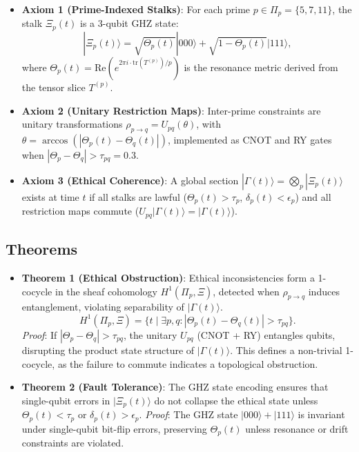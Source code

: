\documentclass{article}
\begin{document}
\begin{itemize}
    \item \textbf{Axiom 1 (Prime-Indexed Stalks)}: For each prime $p \in \Pi_p = \{5, 7, 11\}$, the stalk $\Xi_p(t)$ is a 3-qubit GHZ state:
    \[
    |\Xi_p(t)\rangle = \sqrt{\Theta_p(t)}|000\rangle + \sqrt{1 - \Theta_p(t)}|111\rangle,
    \]
    where $\Theta_p(t) = \text{Re}(e^{2\pi i \cdot \text{tr}(T^{(p)})/p})$ is the resonance metric derived from the tensor slice $T^{(p)}$.

    \item \textbf{Axiom 2 (Unitary Restriction Maps)}: Inter-prime constraints are unitary transformations $\rho_{p \to q} = U_{pq}(\theta)$, with $\theta = \arccos(|\Theta_p(t) - \Theta_q(t)|)$, implemented as CNOT and RY gates when $|\Theta_p - \Theta_q| > \tau_{pq} = 0.3$.

    \item \textbf{Axiom 3 (Ethical Coherence)}: A global section $|\Gamma(t)\rangle = \bigotimes_p |\Xi_p(t)\rangle$ exists at time $t$ if all stalks are lawful ($\Theta_p(t) > \tau_p$, $\delta_p(t) < \epsilon_p$) and all restriction maps commute ($U_{pq}|\Gamma(t)\rangle = |\Gamma(t)\rangle$).
\end{itemize}

\subsection{Theorems}
\begin{itemize}
    \item \textbf{Theorem 1 (Ethical Obstruction)}: Ethical inconsistencies form a 1-cocycle in the sheaf cohomology $H^1(\Pi_p, \Xi)$, detected when $\rho_{p \to q}$ induces entanglement, violating separability of $|\Gamma(t)\rangle$.
    \[
    H^1(\Pi_p, \Xi) = \{ t \mid \exists p, q: |\Theta_p(t) - \Theta_q(t)| > \tau_{pq} \}.
    \]
    \textit{Proof}: If $|\Theta_p - \Theta_q| > \tau_{pq}$, the unitary $U_{pq}$ (CNOT + RY) entangles qubits, disrupting the product state structure of $|\Gamma(t)\rangle$. This defines a non-trivial 1-cocycle, as the failure to commute indicates a topological obstruction.

    \item \textbf{Theorem 2 (Fault Tolerance)}: The GHZ state encoding ensures that single-qubit errors in $|\Xi_p(t)\rangle$ do not collapse the ethical state unless $\Theta_p(t) < \tau_p$ or $\delta_p(t) > \epsilon_p$.
    \textit{Proof}: The GHZ state $|000\rangle + |111\rangle$ is invariant under single-qubit bit-flip errors, preserving $\Theta_p(t)$ unless resonance or drift constraints are violated.
\end{itemize}
\end{document}
